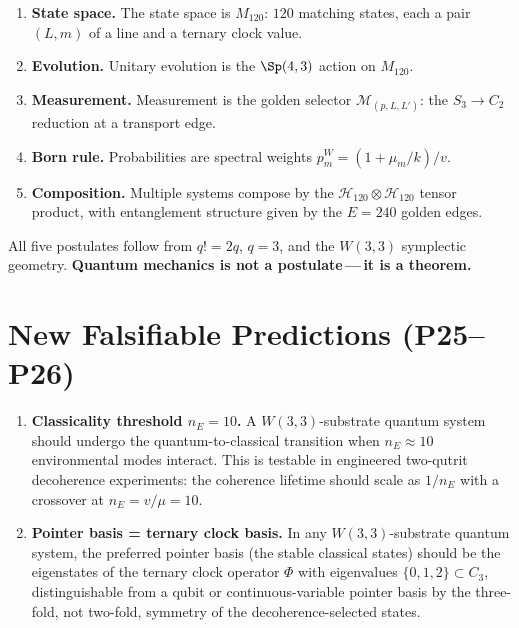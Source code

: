 \begin{tcolorbox}[colback=purple!4!white,colframe=purple!70!black,
  title=\textbf{The $W(3,3)$ Postulates of Quantum Mechanics}]
\begin{enumerate}[nosep]
  \item \textbf{State space.} The state space is $M_{120}$:
        $120$ matching states, each a pair $(L,m)$ of a line
        and a ternary clock value.
  \item \textbf{Evolution.} Unitary evolution is the
        $\Sp(4,3)$ action on $M_{120}$.
  \item \textbf{Measurement.} Measurement is the golden
        selector $\mathcal{M}_{(p,L,L')}$: the $S_3\to C_2$
        reduction at a transport edge.
  \item \textbf{Born rule.} Probabilities are spectral
        weights $p_m^W=(1+\mu_m/k)/v$.
  \item \textbf{Composition.} Multiple systems compose by
        the $\mathcal{H}_{120}\otimes\mathcal{H}_{120}$
        tensor product, with entanglement structure given
        by the $E=240$ golden edges.
\end{enumerate}
All five postulates follow from $q!=2q$, $q=3$, and the
$W(3,3)$ symplectic geometry.  \textbf{Quantum mechanics
is not a postulate\,---\,it is a theorem.}
\end{tcolorbox}

\section{New Falsifiable Predictions (P25--P26)}
\label{sec:qm_predictions}

\begin{enumerate}[label=\textbf{P\arabic*.},start=25]
  \item \textbf{Classicality threshold $n_E=10$.}
        A $W(3,3)$-substrate quantum system should undergo the
        quantum-to-classical transition when $n_E\approx 10$
        environmental modes interact.  This is testable in
        engineered two-qutrit decoherence experiments:
        the coherence lifetime should scale as $1/n_E$ with
        a crossover at $n_E=v/\mu=10$.
  \item \textbf{Pointer basis = ternary clock basis.}
        In any $W(3,3)$-substrate quantum system, the
        preferred pointer basis (the stable classical states)
        should be the eigenstates of the ternary clock
        operator $\Phi$ with eigenvalues $\{0,1,2\}\subset C_3$,
        distinguishable from a qubit or continuous-variable
        pointer basis by the three-fold, not two-fold,
        symmetry of the decoherence-selected states.
\end{enumerate}

